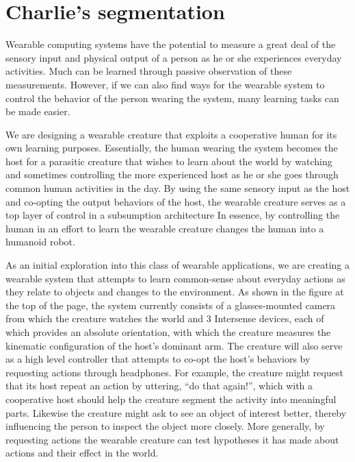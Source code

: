 






\section{Charlie's segmentation}

Wearable computing systems have the potential to measure a great deal
of the sensory input and physical output of a person as he or she
experiences everyday activities. Much can be learned through passive
observation of these measurements. However, if we can also find ways
for the wearable system to control the behavior of the person wearing
the system, many learning tasks can be made easier.

We are designing a wearable creature that exploits a cooperative human
for its own learning purposes. Essentially, the human wearing the
system becomes the host for a parasitic creature that wishes to learn
about the world by watching and sometimes controlling the more
experienced host as he or she goes through common human activities in
the day. By using the same sensory input as the host and co-opting the
output behaviors of the host, the wearable creature serves as a top
layer of control in a subsumption architecture In essence, by
controlling the human in an effort to learn the wearable creature
changes the human into a humanoid robot.

As an initial exploration into this class of wearable applications, we
are creating a wearable system that attempts to learn common-sense
about everyday actions as they relate to objects and changes to the
environment. As shown in the figure at the top of the page, the system
currently consists of a glasses-mounted camera from which the creature
watches the world and 3 Intersense devices, each of which provides an
absolute orientation, with which the creature measures the kinematic
configuration of the host's dominant arm. The creature will also serve
as a high level controller that attempts to co-opt the host's
behaviors by requesting actions through headphones. For example, the
creature might request that its host repeat an action by uttering,
``do that again!'', which with a cooperative host should help the
creature segment the activity into meaningful parts. Likewise the
creature might ask to see an object of interest better, thereby
influencing the person to inspect the object more closely. More
generally, by requesting actions the wearable creature can test
hypotheses it has made about actions and their effect in the world.

